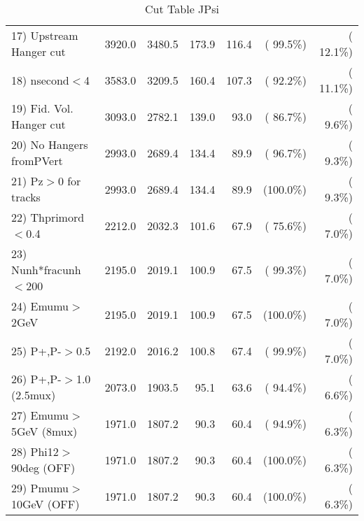 \begin{table}[h!]
\begin{tabular}{||l||r|r|r|r|r|r||}
 17) Upstream Hanger cut  &       3920.0 &       3480.5 &        173.9 &        116.4 & ( 99.5\%) & ( 12.1\%) \\
 18) nsecond$<$4          &       3583.0 &       3209.5 &        160.4 &        107.3 & ( 92.2\%) & ( 11.1\%) \\
 19) Fid. Vol. Hanger cut &       3093.0 &       2782.1 &        139.0 &         93.0 & ( 86.7\%) & (  9.6\%) \\
 20) No Hangers fromPVert &       2993.0 &       2689.4 &        134.4 &         89.9 & ( 96.7\%) & (  9.3\%) \\
 21) Pz$>$0 for tracks    &       2993.0 &       2689.4 &        134.4 &         89.9 & (100.0\%) & (  9.3\%) \\
 22) Thprimord$<$0.4      &       2212.0 &       2032.3 &        101.6 &         67.9 & ( 75.6\%) & (  7.0\%) \\
 23) Nunh*fracunh$<$200   &       2195.0 &       2019.1 &        100.9 &         67.5 & ( 99.3\%) & (  7.0\%) \\
 24) Emumu$>$2GeV         &       2195.0 &       2019.1 &        100.9 &         67.5 & (100.0\%) & (  7.0\%) \\
 25) P+,P-$>$0.5          &       2192.0 &       2016.2 &        100.8 &         67.4 & ( 99.9\%) & (  7.0\%) \\
 26) P+,P-$>$1.0 (2.5mux) &       2073.0 &       1903.5 &         95.1 &         63.6 & ( 94.4\%) & (  6.6\%) \\
 27) Emumu$>$5GeV  (8mux) &       1971.0 &       1807.2 &         90.3 &         60.4 & ( 94.9\%) & (  6.3\%) \\
 28) Phi12$>$90deg  (OFF) &       1971.0 &       1807.2 &         90.3 &         60.4 & (100.0\%) & (  6.3\%) \\
 29) Pmumu$>$10GeV  (OFF) &       1971.0 &       1807.2 &         90.3 &         60.4 & (100.0\%) & (  6.3\%) \\
 \hline
 \hline
 \end{tabular}
 \caption{Cut Table  JPsi     }
 \label{tab-cutcohjpsi-mumu_cohrhop}
 \end{table}
